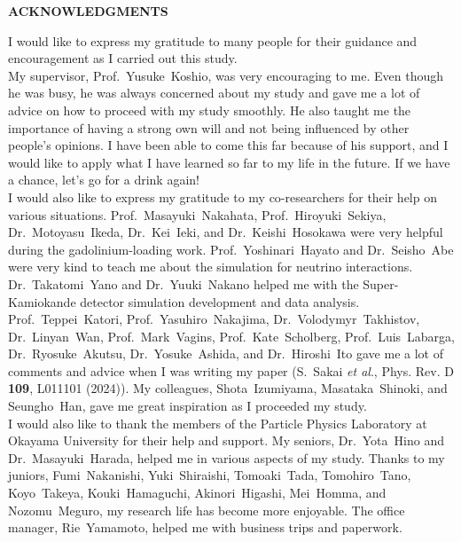

\thispagestyle{empty}

\begin{center}
	{\LARGE\bfseries ACKNOWLEDGMENTS}
\end{center}
\vs\hs
I would like to express my gratitude to many people for their guidance and encouragement as I carried out this study.\\
\hs
My supervisor, Prof.~Yusuke~Koshio, was very encouraging to me.
Even though he was busy, he was always concerned about my study and gave me a lot of advice on how to proceed with my study smoothly.
He also taught me the importance of having a strong own will and not being influenced by other people's opinions.
I have been able to come this far because of his support, and I would like to apply what I have learned so far to my life in the future.
If we have a chance, let's go for a drink again!\\
\hs
I would also like to express my gratitude to my co-researchers for their help on various situations.
Prof.~Masayuki~Nakahata, Prof.~Hiroyuki~Sekiya, Dr.~Motoyasu~Ikeda, Dr.~Kei~Ieki, and Dr.~Keishi~Hosokawa were very helpful during the gadolinium-loading work.
Prof.~Yoshinari~Hayato and Dr.~Seisho~Abe were very kind to teach me about the simulation for neutrino interactions.
Dr.~Takatomi~Yano and Dr.~Yuuki~Nakano helped me with the Super-Kamiokande detector simulation development and data analysis.
Prof.~Teppei~Katori, Prof.~Yasuhiro~Nakajima, Dr.~Volodymyr~Takhistov, Dr.~Linyan~Wan, Prof.~Mark~Vagins, Prof.~Kate~Scholberg, Prof.~Luis~Labarga, Dr.~Ryosuke~Akutsu, Dr.~Yosuke~Ashida, and Dr.~Hiroshi~Ito gave me a lot of comments and advice when I was writing my paper (S.~Sakai \textit{et al}., Phys. Rev. D \textbf{109}, L011101 (2024)).
My colleagues, Shota~Izumiyama, Masataka~Shinoki, and Seungho~Han, gave me great inspiration as I proceeded my study.\\
\hs
I would also like to thank the members of the Particle Physics Laboratory at Okayama University for their help and support.
My seniors, Dr.~Yota~Hino and Dr.~Masayuki~Harada, helped me in various aspects of my study.
Thanks to my juniors, Fumi~Nakanishi, Yuki~Shiraishi, Tomoaki~Tada, Tomohiro~Tano, Koyo~Takeya, Kouki~Hamaguchi, Akinori~Higashi, Mei~Homma, and Nozomu~Meguro, my research life has become more enjoyable.
The office manager, Rie~Yamamoto, helped me with business trips and paperwork.
